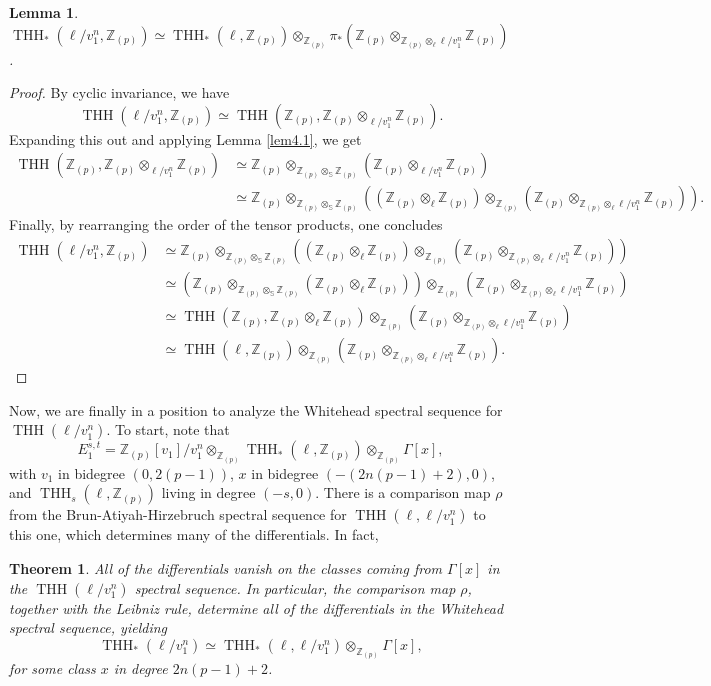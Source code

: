 \documentclass[11pt,leqno]{article}
\newcommand{\zz}{\mathbb{Z}}
\newcommand{\sss}{\mathbb{S}}
\DeclareMathOperator{\THH}{THH}
\newtheorem*{short hand}{theorem name}
\theoremstyle{plain}  %
\newtheorem{theorem}{Theorem}[section]
\newtheorem{lemma}{Lemma}[section]
\theoremstyle{definition}
\numberwithin{equation}{section}
\begin{document}
\begin{lemma}\label{lem4.2}
	$\THH_*(\ell/v_1^n,\zz_{(p)})\simeq \THH_*(\ell,\zz_{(p)})\otimes_{\zz_{(p)}}\pi_*(\zz_{(p)}\otimes_{\zz_{(p)}\otimes_{\ell}\ell/v_1^n}\zz_{(p)})$.
\end{lemma}
\begin{proof}
By cyclic invariance, we have
$$\THH(\ell/v_1^n,\zz_{(p)})\simeq \THH(\zz_{(p)},\zz_{(p)}\otimes_{\ell/v_1^n}\zz_{(p)}).$$
Expanding this out and applying Lemma \ref{lem4.1}, we get
\begin{align*}
\THH(\zz_{(p)},\zz_{(p)}\otimes_{\ell/v_1^n}\zz_{(p)})&\simeq \zz_{(p)}\otimes_{\zz_{(p)}\otimes_{\sss}\zz_{(p)}}(\zz_{(p)}\otimes_{\ell/v_1^n}\zz_{(p)})\\
&\simeq \zz_{(p)}\otimes_{\zz_{(p)}\otimes_{\sss}\zz_{(p)}}((\zz_{(p)}\otimes_{\ell}\zz_{(p)})\otimes_{\zz_{(p)}}(\zz_{(p)}\otimes_{\zz_{(p)}\otimes_{\ell}\ell/v_1^n}\zz_{(p)})).
\end{align*}
Finally, by rearranging the order of the tensor products, one concludes
\begin{align*}
\THH(\ell/v_1^n,\zz_{(p)})&\simeq \zz_{(p)}\otimes_{\zz_{(p)}\otimes_{\sss}\zz_{(p)}}((\zz_{(p)}\otimes_{\ell}\zz_{(p)})\otimes_{\zz_{(p)}}(\zz_{(p)}\otimes_{\zz_{(p)}\otimes_{\ell}\ell/v_1^n}\zz_{(p)}))\\
&\simeq (\zz_{(p)}\otimes_{\zz_{(p)}\otimes_{\sss}\zz_{(p)}}(\zz_{(p)}\otimes_{\ell}\zz_{(p)}))\otimes_{\zz_{(p)}}(\zz_{(p)}\otimes_{\zz_{(p)}\otimes_{\ell}\ell/v_1^n}\zz_{(p)})\\
&\simeq \THH(\zz_{(p)},\zz_{(p)}\otimes_{\ell}\zz_{(p)})\otimes_{\zz_{(p)}}(\zz_{(p)}\otimes_{\zz_{(p)}\otimes_{\ell}\ell/v_1^n}\zz_{(p)})\\
&\simeq \THH(\ell,\zz_{(p)})\otimes_{\zz_{(p)}}(\zz_{(p)}\otimes_{\zz_{(p)}\otimes_{\ell}\ell/v_1^n}\zz_{(p)}).
\end{align*} 
\end{proof}
Now, we are finally in a position to analyze the Whitehead spectral sequence for $\THH(\ell/v_1^n)$.  To start, note that $$E_1^{s,t}=\zz_{(p)}[v_1]/v_1^n\otimes_{\zz_{(p)}}\THH_{*}(\ell,\zz_{(p)})\otimes_{\zz_{(p)}}\Gamma[x],$$ with $v_1$ in bidegree $(0,2(p-1))$, $x$ in bidegree $(-(2n(p-1)+2),0)$, and $\THH_{s}(\ell,\zz_{(p)})$ living in degree $(-s,0)$.  There is a comparison map $\rho$ from the Brun-Atiyah-Hirzebruch spectral sequence for $\THH(\ell,\ell/v_1^n)$ to this one, which determines many of the differentials.  In fact,
\begin{theorem}\label{th4.3}
All of the differentials vanish on the classes coming from $\Gamma[x]$ in the $\THH(\ell/v_1^n)$ spectral sequence.  In particular, the comparison map $\rho$, together with the Leibniz rule, determine all of the differentials in the Whitehead spectral sequence, yielding $$\THH_*(\ell/v_1^n)\simeq \THH_*(\ell,\ell/v_1^n)\otimes_{\zz_{(p)}}\Gamma[x],$$ for some class $x$ in degree $2n(p-1)+2$.
\end{theorem}
\end{document}
